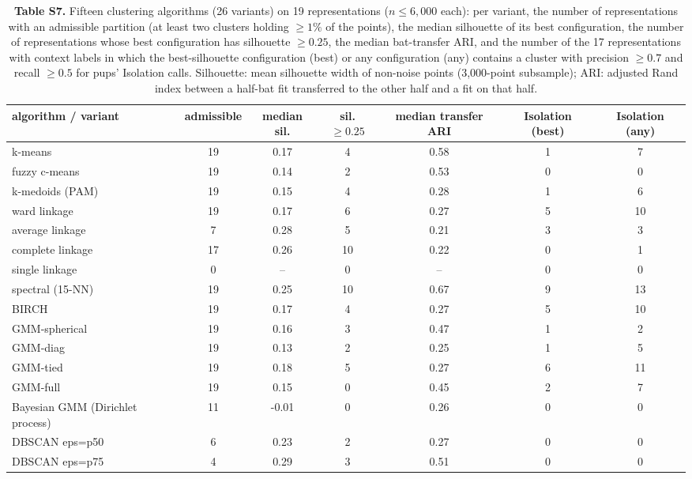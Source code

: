 \begin{table}[htbp]\centering\scriptsize
\caption{\textbf{Table S7.} Fifteen clustering algorithms (26 variants) on 19 representations ($n\le6{,}000$ each): per variant, the number of representations with an admissible partition (at least two clusters holding $\ge1\%$ of the points), the median silhouette of its best configuration, the number of representations whose best configuration has silhouette $\ge0.25$, the median bat-transfer ARI, and the number of the 17 representations with context labels in which the best-silhouette configuration (best) or any configuration (any) contains a cluster with precision $\ge0.7$ and recall $\ge0.5$ for pups' Isolation calls. Silhouette: mean silhouette width of non-noise points (3,000-point subsample); ARI: adjusted Rand index between a half-bat fit transferred to the other half and a fit on that half.}\label{tab:S7}
\begin{adjustbox}{max width=\linewidth}
\begin{tabular}{lcccccc}
\toprule
algorithm / variant & admissible & median sil. & sil.$\ge0.25$ & median transfer ARI & Isolation (best) & Isolation (any) \\
\midrule
k-means & 19 & 0.17 & 4 & 0.58 & 1 & 7 \\
fuzzy c-means & 19 & 0.14 & 2 & 0.53 & 0 & 0 \\
k-medoids (PAM) & 19 & 0.15 & 4 & 0.28 & 1 & 6 \\
ward linkage & 19 & 0.17 & 6 & 0.27 & 5 & 10 \\
average linkage & 7 & 0.28 & 5 & 0.21 & 3 & 3 \\
complete linkage & 17 & 0.26 & 10 & 0.22 & 0 & 1 \\
single linkage & 0 & -- & 0 & -- & 0 & 0 \\
spectral (15-NN) & 19 & 0.25 & 10 & 0.67 & 9 & 13 \\
BIRCH & 19 & 0.17 & 4 & 0.27 & 5 & 10 \\
GMM-spherical & 19 & 0.16 & 3 & 0.47 & 1 & 2 \\
GMM-diag & 19 & 0.13 & 2 & 0.25 & 1 & 5 \\
GMM-tied & 19 & 0.18 & 5 & 0.27 & 6 & 11 \\
GMM-full & 19 & 0.15 & 0 & 0.45 & 2 & 7 \\
Bayesian GMM (Dirichlet process) & 11 & -0.01 & 0 & 0.26 & 0 & 0 \\
DBSCAN eps=p50 & 6 & 0.23 & 2 & 0.27 & 0 & 0 \\
DBSCAN eps=p75 & 4 & 0.29 & 3 & 0.51 & 0 & 0 \\

\end{tabular}
\end{adjustbox}
\end{table}
